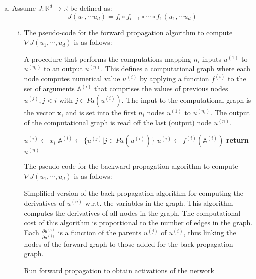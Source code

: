 \documentclass[fleqn]{article}
\begin{document}
\begin{enumerate}[a)]
    \item
    Assume $J : \mathbb{R}^d \rightarrow \mathbb{R}$ be defined as:
    $$J(u_1, \cdots u_d) = f_l \circ f_{l-1} \circ \cdots \circ f_1(u_1, \cdots u_d)$$
    \begin{enumerate}[i)]
        \item 
        The pseudo-code for the forward propagation algorithm to compute $\nabla J(u_1, \cdots , u_d)$ is as follows:
        \begin{algorithm}
            \caption{A procedure that performs the computations mapping $n_i$ inputs $u^{(1)}$ to $u^{(n_i)}$ to an output $u^{(n)}$. This defines a computational graph where each node computes numerical value $u^{(i)}$ by applying a function $f^{(i)}$ to the set of arguments $\mathbb{A}^{(i)}$ that comprises the values of previous nodes $u^{(j)}, j < i$ with $j \in Pa(u^{(i)})$. The input to the computational graph is the vector $\textbf{x}$, and is set into the first $n_i$ nodes $u^{(1)}$ to  $u^{(n_i)}$. The output of the computational graph is read off the last (output) node $u^{(n)}$.}\label{forwardpropJ}
            \begin{algorithmic}[1]
                \State $u^{(i)} \gets x_i$
                \State $\mathbb{A}^{(i)} \gets \{u^{(j)} | j \in Pa(u^{(i)})\}$
                \State $u^{(i)} \gets f^{(i)}(\mathbb{A}^{(i)})$
                \State \textbf{return} $u^{(n)}$
            \end{algorithmic}
        \end{algorithm}
        \hfill \break
        The pseudo-code for the backward propagation algorithm to compute $\nabla J(u_1, \cdots , u_d)$ is as follows:
        \begin{algorithm}
            \caption{Simplified version of the back-propagation algorithm for computing the derivatives of $u^{(n)}$ w.r.t. the variables in the graph. This algorithm computes the derivatives of all nodes in the graph. The computational cost of this algorithm is proportional to the number of edges in the graph. Each $\frac{\partial u^{(i)}}{\partial u^{(j)}}$ is a function of the parents $u^{(j)}$ of $u^{(i)}$, thus linking the nodes of the forward graph to those added for the back-propagation graph.}\label{backpropJ}
            \begin{algorithmic}[1]
                \State Run forward propagation to obtain activations of the network

\end{algorithmic}
\end{algorithm}
\end{enumerate}
\end{enumerate}
\end{document}
